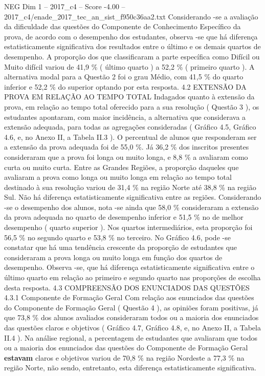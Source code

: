 \begin{textsample}{NEG Dim 1 – 2017\_c4 – Score -4.00 – 2017\_c4/enade\_2017\_tec\_an\_sist\_f950c36aa2.txt}
Considerando -se a avaliação da dificuldade das questões do Componente de Conhecimento Específico da prova, de acordo com o desempenho dos estudantes, observa -se que há diferença estatisticamente significativa dos resultados entre o último e os demais quartos de desempenho.
A proporção dos que classificaram a parte específica como Difícil ou Muito difícil variou de 41,9 \% ( último quarto ) a 52,2 \% ( primeiro quarto ).
A alternativa modal para a Questão 2 foi o grau Médio, com 41,5 \% do quarto inferior e 52,2 \% do superior optando por esta resposta. 4.2 EXTENSÃO DA PROVA EM RELAÇÃO AO TEMPO TOTAL Indagados quanto à extensão da prova, em relação ao tempo total oferecido para a sua resolução ( Questão 3 ), os estudantes apontaram, com maior incidência, a alternativa que considerava a extensão adequada, para todas as agregações consideradas ( Gráfico 4.5, Gráfico 4.6, e, no Anexo II, a Tabela II.3 ).
O percentual de alunos que responderam ser a extensão da prova adequada foi de 55,0 \%.
Já 36,2 \% dos inscritos presentes consideraram que a prova foi longa ou muito longa, e 8,8 \% a avaliaram como curta ou muito curta.
Entre as Grandes Regiões, a proporção daqueles que avaliaram a prova como longa ou muito longa em relação ao tempo total destinado à sua resolução variou de 31,4 \% na região Norte até 38,8 \% na região Sul.
Não há diferença estatisticamente significativa entre as regiões.
Considerando -se o desempenho dos alunos, nota -se ainda que 58,0 \% consideraram a extensão da prova adequada no quarto de desempenho inferior e 51,5 \% no de melhor desempenho ( quarto superior ).
Nos quartos intermediários, esta proporção foi 56,5 \% no segundo quarto e 53,8 \% no terceiro.
No Gráfico 4.6, pode -se constatar que há uma tendência crescente da proporção de estudantes que consideraram a prova longa ou muito longa em função dos quartos de desempenho.
Observa -se, que há diferença estatisticamente significativa entre o último quarto em relação ao primeiro e segundo quarto nas proporções de escolha desta resposta. 4.3 COMPREENSÃO DOS ENUNCIADOS DAS QUESTÕES 4.3.1 Componente de Formação Geral Com relação aos enunciados das questões do Componente de Formação Geral ( Questão 4 ), as opiniões foram positivas, já que 73,8 \% dos alunos avaliados consideraram todos ou a maioria dos enunciados das questões claros e objetivos ( Gráfico 4.7, Gráfico 4.8, e, no Anexo II, a Tabela II.4 ).
Na análise regional, a percentagem de estudantes que avaliaram que todos ou a maioria dos enunciados das questões do Componente de Formação Geral \textbf{estavam} claros e objetivos variou de 70,8 \% na região Nordeste a 77,3 \% na região Norte, não sendo, entretanto, esta diferença estatisticamente significativa.

\end{textsample}
